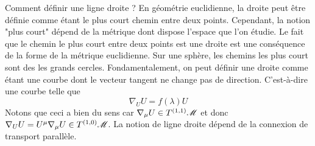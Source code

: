\documentclass[a4paper,11pt]{report}
\begin{document}
            Comment définir une ligne droite ? En géométrie euclidienne, la droite peut être définie comme étant le plus court chemin entre deux points. Cependant, la notion "plus court" dépend de la métrique dont dispose l'espace que l'on étudie. Le fait que le chemin le plus court entre deux points est une droite est une conséquence de la forme de la métrique euclidienne. Sur une sphère, les chemins les plus court sont des les grands cercles. Fondamentalement, on peut définir une droite comme étant une courbe dont le vecteur tangent ne change pas de direction. C'est-à-dire une courbe telle que
            \begin{equation}
                \nabla_U U = f(\lambda) U
            \end{equation}
            Notons que ceci a bien du sens car $\nabla_\mu U\in T^{(1,1)}\mathscr{M}$ et donc $\nabla_U U = U^\mu\nabla_\mu U\in T^{(1,0)}\mathscr{M}$. La notion de ligne droite dépend de la connexion de transport parallèle.\\
            
\end{document}
